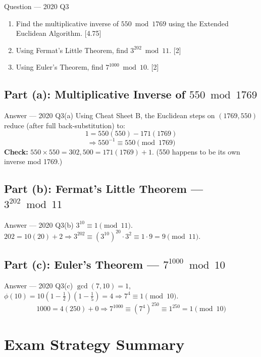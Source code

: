 \documentclass[12pt,a4paper]{article}
\begin{document}
\newpage
\begin{qbox}{Question --- 2020 Q3}
\begin{enumerate}[label=(\alph*)]
  \item Find the multiplicative inverse of $550 \bmod 1769$ using the Extended Euclidean Algorithm. \hfill [4.75]
  \item Using Fermat's Little Theorem, find $3^{202} \bmod 11$. \hfill [2]
  \item Using Euler's Theorem, find $7^{1000} \bmod 10$. \hfill [2]
\end{enumerate}
\end{qbox}

\subsection{Part (a): Multiplicative Inverse of $550 \bmod 1769$}
\begin{solbox}{Answer --- 2020 Q3(a)}
Using Cheat Sheet B, the Euclidean steps on $(1769,550)$ reduce (after full back-substitution) to:
\[
1 = 550(550) - 171(1769)
\]
\[
\Rightarrow 550^{-1} \equiv \boxed{550} \pmod{1769}
\]
\textbf{Check:} $550\times550=302{,}500=171(1769)+1$. \checkmark \quad (550 happens to be its own inverse mod 1769.)
\end{solbox}

\subsection{Part (b): Fermat's Little Theorem --- $3^{202}\bmod11$}
\begin{solbox}{Answer --- 2020 Q3(b)}
$3^{10}\equiv1\pmod{11}$. $202=10(20)+2 \Rightarrow 3^{202}\equiv(3^{10})^{20}\cdot3^2\equiv1\cdot9=\boxed{9}\pmod{11}$.
\end{solbox}

\subsection{Part (c): Euler's Theorem --- $7^{1000}\bmod10$}
\begin{solbox}{Answer --- 2020 Q3(c)}
$\gcd(7,10)=1$, $\phi(10)=10(1-\tfrac12)(1-\tfrac15)=4 \Rightarrow 7^4\equiv1\pmod{10}$.
\[
1000=4(250)+0 \Rightarrow 7^{1000}\equiv(7^4)^{250}\equiv1^{250}=\boxed{1}\pmod{10}
\]
\end{solbox}

\newpage
\section*{Exam Strategy Summary}
\end{document}
